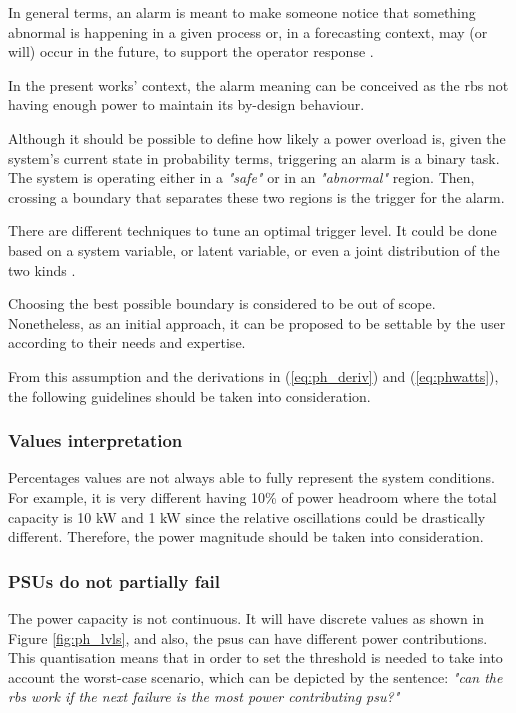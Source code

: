 In general terms, an alarm is meant to make someone notice that something abnormal is happening in a given process or, in a forecasting context, may (or will) occur in the future, to support the operator response \cite{iec_alarms}.

In the present works' context, the alarm meaning can be conceived as the \ac{rbs} not having enough power to maintain its by-design behaviour.

Although it should be possible to define how likely a power overload is, given the system's current state in probability terms, triggering an alarm is a binary task. The system is operating either in a \emph{"safe"}  or in an \emph{"abnormal"} region. Then, crossing a boundary that separates these two regions is the trigger for the alarm. 

There are different techniques to tune an optimal trigger level. It could be done based on a system variable, or latent variable, or even a joint distribution of the two kinds \cite{izadi2009alarms}. 

Choosing the best possible boundary is considered to be out of scope. Nonetheless, as an initial approach, it can be proposed to be settable by the user according to their needs and expertise. 

From this assumption and the derivations in (\ref{eq:ph_deriv}) and (\ref{eq:phwatts}), the following guidelines should be taken into consideration. 

\subsubsection*{Values interpretation}

Percentages values are not always able to fully represent the system conditions. For example, it is very different having 10\% of power headroom where the total capacity is 10 kW and 1 kW since the relative oscillations could be drastically different. Therefore, the power magnitude should be taken into consideration. 

\subsubsection*{PSUs do not partially fail}

The power capacity is not continuous. It will have discrete values as shown in Figure \ref{fig:ph_lvls}, and also, the \acp{psu} can have different power contributions. This quantisation means that in order to set the threshold is needed to take into account the worst-case scenario, which can be depicted by the sentence: \emph{"can the \ac{rbs} work if the next failure is the most power contributing \ac{psu}?"}

